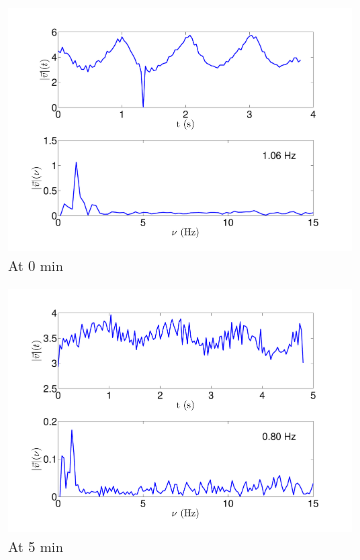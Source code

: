 \documentclass[12pt]{article}
\begin{document}
\begin{figure}[h!]
	\begin{subfigure}[h!]{0.5\textwidth}
    \centering
       \includegraphics[scale=0.3]{voft_ps_0min.pdf}
       \caption{At 0 min}
       \label{fig:vs0min}
	\end{subfigure}
	\hfill
	\begin{subfigure}[h!]{0.5\textwidth}
    \centering
       \includegraphics[scale=0.3]{voft_ps_5min.pdf}
       \caption{At 5 min}
       \label{fig:vs5min}
	\end{subfigure}
	\newline
	\begin{subfigure}[h!]{0.5\textwidth}
    \centering

\end{subfigure}
\end{figure}
\end{document}
